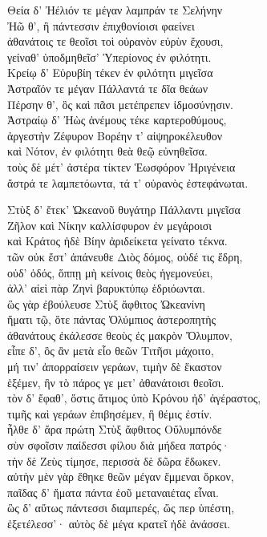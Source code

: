\quad{}Θεία δ' Ἠέλιόν τε μέγαν λαμπράν τε Σελήνην \\
Ἠῶ θ', ἣ πάντεσσιν ἐπιχθονίοισι φαείνει\\
ἀθανάτοις τε θεοῖσι τοὶ οὐρανὸν εὐρὺν ἔχουσι,\\
γείναθ' ὑποδμηθεῖσ' Ὑπερίονος ἐν φιλότητι. \\
Κρείῳ δ' Εὐρυβίη τέκεν ἐν φιλότητι μιγεῖσα  \\
Ἀστραῖόν τε μέγαν Πάλλαντά τε δῖα θεάων\\
Πέρσην θ', ὃς καὶ πᾶσι μετέπρεπεν ἰδμοσύνῃσιν.\\
Ἀστραίῳ δ' Ἠὼς ἀνέμους τέκε καρτεροθύμους,\\
ἀργεστὴν Ζέφυρον Βορέην τ' αἰψηροκέλευθον \\
καὶ Νότον, ἐν φιλότητι θεὰ θεῷ εὐνηθεῖσα. \\
τοὺς δὲ μέτ' ἀστέρα τίκτεν Ἑωσφόρον Ἠριγένεια\\
ἄστρά τε λαμπετόωντα, τά τ' οὐρανὸς ἐστεφάνωται. 

\quad{}Στὺξ δ' ἔτεκ' Ὠκεανοῦ θυγάτηρ Πάλλαντι μιγεῖσα\\
Ζῆλον καὶ Νίκην καλλίσφυρον ἐν μεγάροισι \\
καὶ Κράτος ἠδὲ Βίην ἀριδείκετα γείνατο τέκνα.  \\
τῶν οὐκ ἔστ' ἀπάνευθε Διὸς δόμος, οὐδέ τις ἕδρη,\\
οὐδ' ὁδός, ὅππῃ μὴ κείνοις θεὸς ἡγεμονεύει,\\
ἀλλ' αἰεὶ πὰρ Ζηνὶ βαρυκτύπῳ ἑδριόωνται.\\
ὣς γὰρ ἐβούλευσε Στὺξ ἄφθιτος Ὠκεανίνη\\
ἤματι τῷ, ὅτε πάντας Ὀλύμπιος ἀστεροπητὴς \\
ἀθανάτους ἐκάλεσσε θεοὺς ἐς μακρὸν Ὄλυμπον,\\
εἶπε δ', ὃς ἂν μετὰ εἷο θεῶν Τιτῆσι μάχοιτο,\\
μή τιν' ἀπορραίσειν γεράων, τιμὴν δὲ ἕκαστον\\
ἑξέμεν, ἣν τὸ πάρος γε μετ' ἀθανάτοισι θεοῖσι.\\
τὸν δ' ἔφαθ', ὅστις ἄτιμος ὑπὸ Κρόνου ἠδ' ἀγέραστος, \\
τιμῆς καὶ γεράων ἐπιβησέμεν, ἣ θέμις ἐστίν.\\
ἦλθε δ' ἄρα πρώτη Στὺξ ἄφθιτος Οὔλυμπόνδε\\
σὺν σφοῖσιν παίδεσσι φίλου διὰ μήδεα πατρός· \\
τὴν δὲ Ζεὺς τίμησε, περισσὰ δὲ δῶρα ἔδωκεν.\\
αὐτὴν μὲν γὰρ ἔθηκε θεῶν μέγαν ἔμμεναι ὅρκον, \\
παῖδας δ' ἤματα πάντα ἑοῦ μεταναιέτας εἶναι.\\
ὣς δ' αὔτως πάντεσσι διαμπερές, ὥς περ ὑπέστη,\\
ἐξετέλεσσ'· αὐτὸς δὲ μέγα κρατεῖ ἠδὲ ἀνάσσει. 


